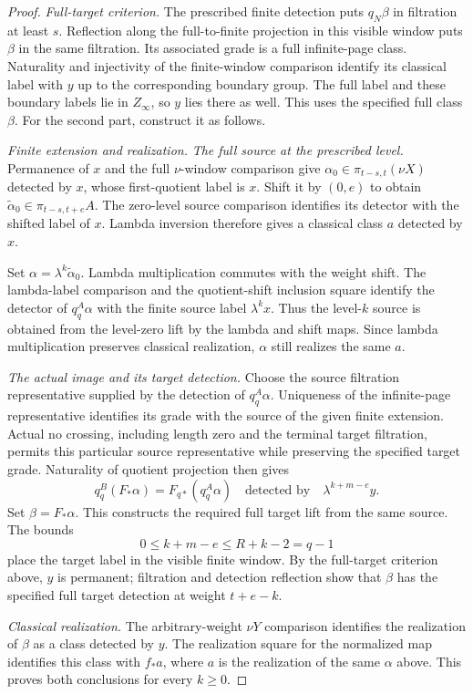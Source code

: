 \begin{proof}
\textit{Full-target criterion.}
The prescribed finite detection puts $q_N\beta$ in filtration at
least $s$. Reflection along the full-to-finite projection in this
visible window puts $\beta$ in the same filtration. Its associated
grade is a full infinite-page class. Naturality and injectivity of
the finite-window comparison identify its classical label with $y$
up to the corresponding boundary group. The full label and these
boundary labels lie in $Z_\infty$, so $y$ lies there as well.
This uses the specified full class $\beta$. For the second part,
construct it as follows.

\textit{Finite extension and realization.}
\textit{The full source at the prescribed level.}
Permanence of $x$ and the full $\nu$-window comparison give
$\alpha_0\in\pi_{t-s,t}(\nu X)$ detected by $x$, whose first-quotient
label is $x$. Shift it by $(0,e)$ to obtain
$\widetilde\alpha_0\in\pi_{t-s,t+e}A$.
The zero-level source comparison identifies its detector with the
shifted label of $x$. Lambda inversion therefore gives a classical
class $a$ detected by $x$.

Set $\alpha=\lambda^k\widetilde\alpha_0$.
Lambda multiplication commutes with the weight shift. The lambda-label
comparison and the quotient-shift inclusion square identify the detector
of $q_q^A\alpha$ with the finite source label $\lambda^kx$.
Thus the level-$k$ source is obtained from the level-zero lift by the
lambda and shift maps. Since lambda multiplication preserves classical
realization, $\alpha$ still realizes the same $a$.

\textit{The actual image and its target detection.}
Choose the source filtration representative supplied by the
detection of $q_q^A\alpha$. Uniqueness of the infinite-page
representative identifies its grade with the source of the given
finite extension. Actual no crossing, including length zero and
the terminal target filtration, permits this particular source
representative while preserving the specified target grade.
Naturality of quotient projection then gives
\[
q_q^B(F_*\alpha)=F_{q*}(q_q^A\alpha)
\quad\text{detected by}\quad \lambda^{k+m-e}y.
\]
Set $\beta=F_*\alpha$. This constructs the required full target
lift from the same source. The bounds
\[
0\le k+m-e\le R+k-2=q-1
\]
place the target label in the visible finite window. By
the full-target criterion above, $y$ is permanent;
filtration and detection reflection show that $\beta$ has the
specified full target detection at weight $t+e-k$.

\textit{Classical realization.}
The arbitrary-weight $\nu Y$ comparison identifies the realization
of $\beta$ as a class detected by $y$. The realization square for
the normalized map identifies this class with $f_*a$,
where $a$ is the realization of the same $\alpha$ above.
This proves both conclusions for every $k\ge0$.
\end{proof}


